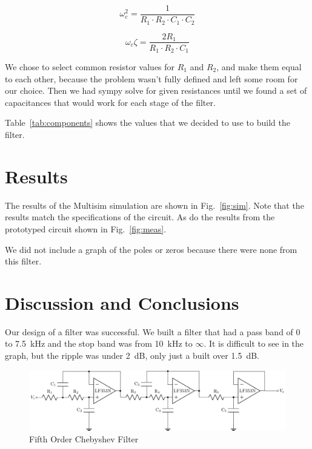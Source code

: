 \documentclass[11pt]{texMemo-gibbons}
\begin{document}
\[
  \omega_c^2 = \frac{1}{R_1 \cdot R_2 \cdot C_1 \cdot C_2}
\]

\[
  \omega_c \zeta = \frac{2 R_1}{R_1 \cdot R_2 \cdot C_1}
\]

We chose to select common resistor values for $R_1$ and $R_2$,
and make them equal to each other, because the problem wasn't 
fully defined and left some room for our choice. Then we 
had sympy solve for given resistances until we found a set 
of capacitances that would work for each stage of the filter.

Table~\ref{tab:components} shows the values that we decided to use
to build the filter.



\section{Results}
\label{sec:results}

The results of the Multisim simulation are shown in Fig.~\ref{fig:sim}.
Note that the results match the specifications of the circuit. As do 
the results from the prototyped circuit shown in Fig.~\ref{fig:meas}.

We did not include a graph of the poles or zeros because there 
were none from this filter.


\section{Discussion and Conclusions}
\label{sec:conclusions}

Our design of a filter was successful. We built a filter that had 
a pass band of 0 to 7.5~kHz and the stop band was from 10~kHz to $\infty$.
It is difficult to see in the graph, but the ripple was under 2~dB, only just a 
built over 1.5~dB.

\clearpage

\begin{figure}[h!]
  \centering
  \includegraphics[width=\textwidth]{../circuits/circuit_blank.pdf}
  \caption{Fifth Order Chebyshev Filter}
  \label{fig:circuit}
\end{figure}
\end{document}
